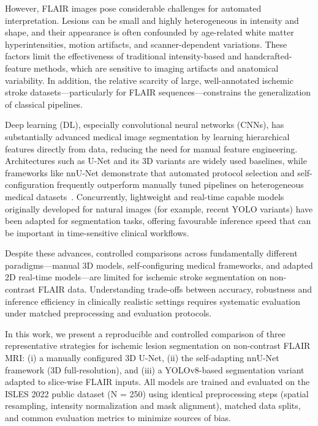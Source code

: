 \documentclass[12pt]{article}
\begin{document}
However, FLAIR images pose considerable challenges for automated interpretation. Lesions can be small and highly heterogeneous in intensity and shape, and their appearance is often confounded by age-related white matter hyperintensities, motion artifacts, and scanner-dependent variations. These factors limit the effectiveness of traditional intensity-based and handcrafted-feature methods, which are sensitive to imaging artifacts and anatomical variability. In addition, the relative scarcity of large, well-annotated ischemic stroke datasets—particularly for FLAIR sequences—constrains the generalization of classical pipelines.

Deep learning (DL), especially convolutional neural networks (CNNs), has substantially advanced medical image segmentation by learning hierarchical features directly from data, reducing the need for manual feature engineering. Architectures such as U-Net and its 3D variants are widely used baselines, while frameworks like nnU-Net demonstrate that automated protocol selection and self-configuration frequently outperform manually tuned pipelines on heterogeneous medical datasets~\cite{Isensee2021}. Concurrently, lightweight and real-time capable models originally developed for natural images (for example, recent YOLO variants) have been adapted for segmentation tasks, offering favourable inference speed that can be important in time-sensitive clinical workflows.

Despite these advances, controlled comparisons across fundamentally different paradigms—manual 3D models, self-configuring medical frameworks, and adapted 2D real-time models—are limited for ischemic stroke segmentation on non-contrast FLAIR data. Understanding trade-offs between accuracy, robustness and inference efficiency in clinically realistic settings requires systematic evaluation under matched preprocessing and evaluation protocols.

In this work, we present a reproducible and controlled comparison of three representative strategies for ischemic lesion segmentation on non-contrast FLAIR MRI: (i) a manually configured 3D U-Net, (ii) the self-adapting nnU-Net framework (3D full-resolution), and (iii) a YOLOv8-based segmentation variant adapted to slice-wise FLAIR inputs. All models are trained and evaluated on the ISLES 2022 public dataset (N = 250) using identical preprocessing steps (spatial resampling, intensity normalization and mask alignment), matched data splits, and common evaluation metrics to minimize sources of bias.
\end{document}
